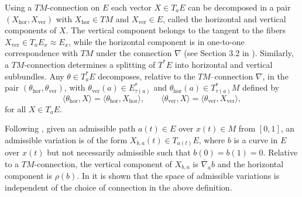 \documentclass[11pt,a4paper]{article}
\theoremstyle{definition}
\begin{document}



Using a $TM$-connection on $E$ each vector $X\in T_{a}E$ can be decomposed in a pair $(X_{\mathrm{hor}},X_{\mathrm{ver}})$ with $X_{\mathrm{hor}}\in TM$ and $X_{\mathrm{ver}}\in E$, called the horizontal and vertical components of $X$. The vertical component belongs to the tangent to the fibers $X_{\mathrm{ver}}\in T_{a}E_{x}\approx E_{x}$, while the horizontal component is in one-to-one correspondence with $TM$ under the connection $\nabla$ (see Section 3.2 in \cite{LOJAFERNANDES2002119}).  Similarly, a $TM$-connection determines a splitting of $T^{*}E$ into horizontal and vertical subbundles. Any $\theta \in T^{*}_{a}E$ decomposes, relative to the $TM$–connection $\nabla$, in the pair $(\theta_{\mathrm{hor}},\theta_{\mathrm{ver}})$, with $\theta_{\mathrm{ver}}(a)\in E^*_{\tau(a)}$ and $\theta_{\mathrm{hor}}(a)\in T^*_{\tau(a)}M$ defined by
$$\langle\theta_{\mathrm{hor}},X \rangle = \langle\theta_{\mathrm{hor}},X_{\mathrm{hor}} \rangle, \qquad \langle\theta_{\mathrm{ver}},X \rangle = \langle\theta_{\mathrm{ver}},X_{\mathrm{ver}} \rangle,$$
for all $X\in T_{a}E$.

Following \cite{li2017lagrangian, hu2024hamiltonian}, given an admissible path $a(t)\in E$ over $x(t)\in M$ from $[0,1]$, an admissible variation is of the form $X_{b,a}(t)\in T_{a(t)}E$, where $b$ is a curve in $E$ over $x(t)$ but not necessarily admissible such that $b(0)=b(1)=0.$ Relative to a $TM$-connection, the vertical component of $X_{b,a}$ is $\overline{\nabla}_{a} b$ and the horizontal component is $\rho(b)$. In \cite{CrainicFernandes2003Integrability} it is shown that the space of admissible variations is independent of the choice of connection in the above definition.
\end{document}
